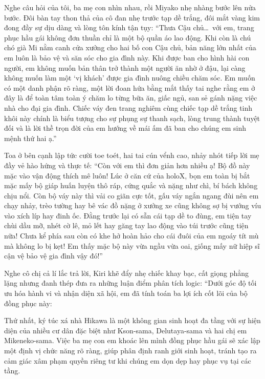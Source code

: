 \documentclass[../main.tex]{subfiles}
\begin{document}
Nghe câu hỏi của tôi, ba mẹ con nhìn nhau, rồi Miyako nhẹ nhàng bước lên nửa bước. Đôi bàn tay thon thả của cô đan nhẹ trước tạp dề trắng, đôi mắt vàng kim đong đầy sự dịu dàng và lòng tôn kính tận tụy: ``Thưa Cậu chủ\dots\ với em, trang phục hầu gái không đơn thuần chỉ là một bộ quần áo lao động. Khi còn là chú chó già Mi nằm canh cửa xưởng cho hai bố con Cậu chủ, bản năng lớn nhất của em luôn là bảo vệ và săn sóc cho gia đình này. Khi được ban cho hình hài con người, em không muốn bản thân trở thành một người ăn nhờ ở đậu, lại càng không muốn làm một `vị khách' được gia đình nuông chiều chăm sóc. Em muốn có một danh phận rõ ràng, một lời đoan hứa bằng mắt thấy tai nghe rằng em ở đây là để toàn tâm toàn ý chăm lo từng bữa ăn, giấc ngủ, san sẻ gánh nặng việc nhà cho đại gia đình. Chiếc váy đen trang nghiêm cùng chiếc tạp dề trắng tinh khôi này chính là biểu tượng cho sự phụng sự thanh sạch, lòng trung thành tuyệt đối và là lời thề trọn đời của em hướng về mái ấm đã ban cho chúng em sinh mệnh thứ hai ạ.''

Toa ở bên cạnh lập tức cười toe toét, hai tai cún vểnh cao, nhảy nhót tiếp lời mẹ đầy vẻ hào hứng và thực tế: ``Còn với em thì đơn giản hơn nhiều ạ! Bộ đồ này mặc vào vận động thích mê luôn! Lúc ở căn cứ của holoX, bọn em toàn bị bắt mặc mấy bộ giáp huấn luyện thô ráp, cứng quắc và nặng như chì, bí bách không chịu nổi. Còn bộ váy này thì vải co giãn cực tốt, gấu váy ngắn ngang đùi nên em chạy nhảy, trèo tường hay bê vác đồ nặng ở xưởng xe cũng không sợ bị vướng víu vào xích líp hay đinh ốc. Đằng trước lại có sẵn cái tạp dề to đùng, em tiện tay chùi dầu mỡ, nhét cờ lê, mỏ lết hay găng tay lao động vào túi trước cũng tiện nữa! Chưa kể phía sau còn có khe hở hoàn hảo cho cái đuôi của em ngoáy tít mù mà không lo bị kẹt! Em thấy mặc bộ này vừa ngầu vừa oai, giống mấy nữ hiệp sĩ cận vệ bảo vệ gia đình vậy đó!''

Nghe cô chị cả lí lắc trả lời, Kiri khẽ đẩy nhẹ chiếc khay bạc, cất giọng phẳng lặng nhưng đanh thép đưa ra những luận điểm phân tích logic: ``Dưới góc độ tối ưu hóa hành vi và nhận diện xã hội, em đã tính toán ba lợi ích cốt lõi của bộ đồng phục này:

Thứ nhất, ký túc xá nhà Hikawa là một không gian sinh hoạt đa tầng với sự hiện diện của nhiều cư dân đặc biệt như Kson-sama, Delutaya-sama và hai chị em Mikeneko-sama. Việc ba mẹ con em khoác lên mình đồng phục hầu gái sẽ xác lập một định vị chức năng rõ ràng, giúp phân định ranh giới sinh hoạt, tránh tạo ra cảm giác xâm phạm quyền riêng tư khi chúng em dọn dẹp hay phục vụ tại các tầng.
\end{document}
